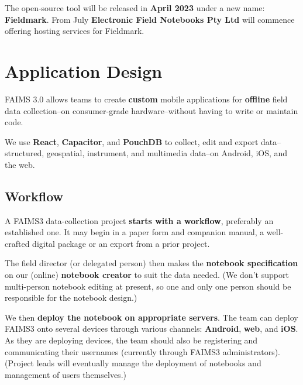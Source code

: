 \documentclass[a0,portrait]{a0poster}
\begin{document}
\begin{multicols}{3}
The open-source tool will be released in \textbf{April 2023} under a new name: \textbf{Fieldmark}. From July \textbf{Electronic Field Notebooks Pty Ltd} will commence offering hosting services for Fieldmark.






\section*{Application Design}

FAIMS 3.0 allows teams to create \textbf{custom} mobile applications for \textbf{offline} field data collection--on consumer-grade hardware--without having to write or maintain code.

We use \textbf{React}, \textbf{Capacitor}, and \textbf{PouchDB} to collect, edit and export data--structured, geospatial, instrument, and multimedia data--on Android, iOS, and the web. 



\subsection*{Workflow}
A FAIMS3 data-collection project \textbf{starts with a workflow}, preferably an established one. It may begin in a paper form and companion manual, a well-crafted digital package or an export from a prior project.


The field director (or delegated person) then makes the \textbf{notebook specification} on our (online) \textbf{notebook creator} to suit the data needed. (We don’t support multi-person notebook editing at present, so one and only one person should be responsible for the notebook design.) 

We then \textbf{deploy the notebook on appropriate servers}. The team can deploy FAIMS3 onto several devices through various channels: \textbf{Android}, \textbf{web}, and \textbf{iOS}. As they are deploying devices, the team should also be registering and communicating their usernames (currently through FAIMS3 administrators). (Project leads will eventually manage the deployment of notebooks and management of users themselves.)



\end{multicols}
\end{document}
